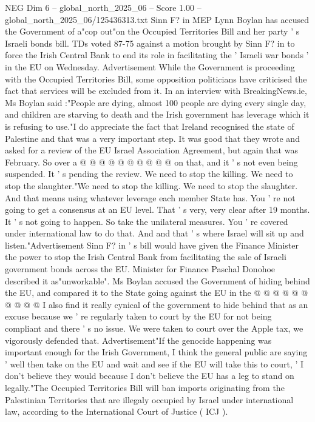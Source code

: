\begin{textsample}{NEG Dim 6 – global\_north\_2025\_06 – Score 1.00 – global\_north\_2025\_06/125436313.txt}  \label{ex:f6_neg_421}
Sinn F? in MEP Lynn Boylan has accused the Government of a"cop out"on the Occupied Territories Bill and her party ' s Israeli bonds bill.
TDs voted 87-75 against a motion brought by Sinn F? in to force the Irish Central Bank to end its role in facilitating the ' Israeli war bonds ' in the EU on Wednesday.
Advertisement While the Government is proceeding with the Occupied Territories Bill, some opposition politicians have criticised the fact that services will be excluded from it.
In an interview with BreakingNews.ie, Ms Boylan said :"People are dying, almost 100 people are dying every single day, and children are starving to death and the Irish government has leverage which it is refusing to use."I do appreciate the fact that Ireland recognised the state of Palestine and that was a very important step.
It was good that they wrote and asked for a review of the EU Israel Association Agreement, but again that was February.
So over a @ @ @ @ @ @ @ @ @ @ on that, and it ' s not even being suspended.
It ' s pending the review.
We need to stop the killing.
We need to stop the slaughter."We need to stop the killing.
We need to stop the slaughter.
And that means using whatever leverage each member State has.
You ' re not going to get a consensus at an EU level.
That ' s very, very clear after 19 months.
It ' s not going to happen.
So take the unilateral measures.
You ' re covered under international law to do that.
And and that ' s where Israel will sit up and listen."Advertisement Sinn F? in ' s bill would have given the Finance Minister the power to stop the Irish Central Bank from facilitating the sale of Israeli government bonds across the EU.
Minister for Finance Paschal Donohoe described it as"unworkable".
Ms Boylan accused the Government of hiding behind the EU, and compared it to the State going against the EU in the @ @ @ @ @ @ @ @ @ @ I also find it really cynical of the government to hide behind that as an excuse because we ' re regularly taken to court by the EU for not being compliant and there ' s no issue.
We were taken to court over the Apple tax, we vigorously defended that.
Advertisement"If the genocide happening was important enough for the Irish Government, I think the general public are saying ' well then take on the EU and wait and see if the EU will take this to court, ' I don't believe they would because I don't believe the EU has a leg to stand on legally."The Occupied Territories Bill will ban imports originating from the Palestinian Territories that are illegaly occupied by Israel under international law, according to the International Court of Justice ( ICJ ).

\end{textsample}
